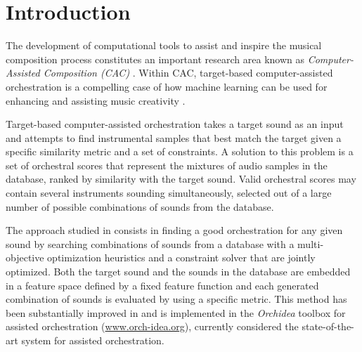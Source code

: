 \documentclass[runningheads,a4paper]{llncs}
\begin{document}
%
\section{Introduction}\label{sec:introduction}

The development of computational tools to assist and inspire the musical composition process constitutes an important research area known as \emph{Computer-Assisted Composition (CAC)} \cite{FerVic2013, Ari2005}. Within CAC, target-based computer-assisted orchestration is a compelling case of how machine learning can be used for {enhancing} and {assisting} music creativity \cite{Maresz2003}. 

Target-based computer-assisted orchestration takes a target sound as an input and attempts to find instrumental samples that best match the target given a specific similarity metric and a set of constraints. A solution to this problem is a set of orchestral scores that represent the mixtures of audio samples in the database, ranked by similarity with the target sound. Valid orchestral scores may contain several instruments sounding simultaneously, selected out of a large number of possible combinations of sounds from the database.

The approach studied in \cite{Carpentier2010} consists in finding a good orchestration for any given sound by searching combinations of sounds from a database with a multi-objective optimization heuristics and a constraint solver that are jointly optimized. Both the target sound and the sounds in the database are embedded in a feature space defined by a fixed feature function and each generated combination of sounds is evaluated by using a specific metric. This method has been substantially improved in \cite{Cella18, Cella2020} and is implemented in the \emph{Orchidea} toolbox for assisted orchestration (\url{www.orch-idea.org}), currently considered the state-of-the-art system for assisted orchestration.
\end{document}
